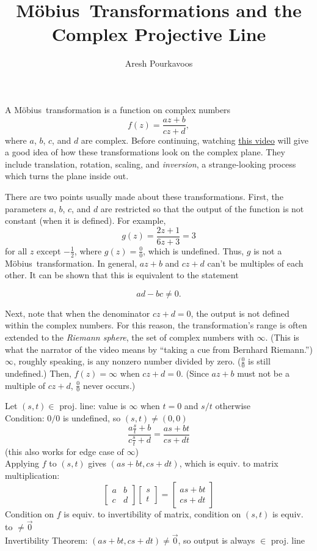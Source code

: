 \documentclass{article}
\begin{document}
\newcommand{\mobius}{M{\"o}bius\ }

\title{\mobius Transformations and the Complex Projective Line}
\author{Aresh Pourkavoos}
\maketitle

A \mobius transformation is a function on complex numbers
\[f(z)=\frac{az+b}{cz+d},\]
where $a$, $b$, $c$, and $d$ are complex.
Before continuing, watching
\href{http://www-users.math.umn.edu/~arnold//moebius/}{this video}
will give a good idea of how these transformations look on the complex plane.
They include translation, rotation, scaling, and \textit{inversion},
a strange-looking process which turns the plane inside out.

There are two points usually made about these transformations.
First, the parameters $a$, $b$, $c$, and $d$ are restricted
so that the output of the function is not constant
(when it is defined).
For example,
\[g(z)=\frac{2z+1}{6z+3}=3\]
for all $z$ except $-\frac{1}{2}$, where $g(z)=\frac{0}{0}$, which is undefined.
Thus, $g$ is not a \mobius transformation.
In general, $az+b$ and $cz+d$ can't be multiples of each other.
It can be shown that this is equivalent to the statement

\[ad-bc \neq 0.\]

Next, note that when the denominator $cz+d=0$,
the output is not defined within the complex numbers.
For this reason, the transformation's range is often extended
to the \textit{Riemann sphere}, the set of complex numbers with $\infty$.
(This is what the narrator of the video means by
``taking a cue from Bernhard Riemann.'')
$\infty$, roughly speaking, is any nonzero number divided by zero.
($\frac{0}{0}$ is still undefined.)
Then, $f(z)=\infty$ when $cz+d=0$.
(Since $az+b$ must not be a multiple of $cz+d$,
$\frac{0}{0}$ never occurs.)

Let $(s, t) \in$ proj. line:
value is $\infty$ when $t=0$ and $s/t$ otherwise \\
Condition: $0/0$ is undefined, so $(s, t) \neq (0, 0)$\\
\[\frac{a\frac{s}{t}+b}{c\frac{s}{t}+d}=\frac{as+bt}{cs+dt}\]
(this also works for edge case of $\infty$)\\
Applying $f$ to $(s, t)$ gives $(as+bt, cs+dt)$, which is equiv. to matrix multiplication:
\[\begin{bmatrix} a & b \\ c & d \end{bmatrix}
\begin{bmatrix} s \\ t \end{bmatrix} =
\begin{bmatrix} as+bt \\ cs+dt \end{bmatrix}\]
Condition on $f$ is equiv. to invertibility of matrix,
condition on $(s, t)$ is equiv. to $\neq\vec{0}$\\
Invertibility Theorem: $(as+bt, cs+dt)\neq\vec{0}$,
so output is always $\in$ proj. line

\end{document}
